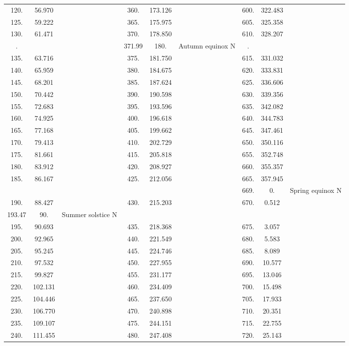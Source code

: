 \begin{tabular}{|c|c|c||c|c|c||c|c|c|}
120. &  56.970 & &360. & 173.126& &600. & 322.483&  \\ 
125. &  59.222 & &365. & 175.975& &605. & 325.358&  \\ 
130. &  61.471 & &370. & 178.850& &610. & 328.207&  \\ 
   . &         & &371.99 & 180.   & Autumn equinox N &   . &        &  \\ 
135. &  63.716 & &375. & 181.750& &615. & 331.032&  \\ 
140. &  65.959 & &380. & 184.675& &620. & 333.831&  \\ 
145. &  68.201 & &385. & 187.624& &625. & 336.606&  \\ 
150. &  70.442 & &390. & 190.598& &630. & 339.356&  \\ 
155. &  72.683 & &395. & 193.596& &635. & 342.082&  \\ 
160. &  74.925 & &400. & 196.618& &640. & 344.783&  \\ 
165. &  77.168 & &405. & 199.662& &645. & 347.461&  \\ 
170. &  79.413 & &410. & 202.729& &650. & 350.116&  \\ 
175. &  81.661 & &415. & 205.818& &655. & 352.748&  \\ 
180. &  83.912 & &420. & 208.927& &660. & 355.357&  \\ 
185. &  86.167 & &425. & 212.056& &665. & 357.945&  \\ 
  &  &  & & & &669. &   0.& Spring equinox N  \\ 
190. &  88.427 & &430. & 215.203& &670. &   0.512&  \\ 
193.47  & 90.  & Summer solstice N  & & & & &  &  \\ 
195. &  90.693 & &435. & 218.368& &675. &   3.057&  \\ 
200. &  92.965 & &440. & 221.549& &680. &   5.583&  \\ 
205. &  95.245 & &445. & 224.746& &685. &   8.089&  \\ 
210. &  97.532 & &450. & 227.955& &690. &  10.577&  \\ 
215. &  99.827 & &455. & 231.177& &695. &  13.046&  \\ 
220. & 102.131 & &460. & 234.409& &700. &  15.498&  \\ 
225. & 104.446 & &465. & 237.650& &705. &  17.933&  \\ 
230. & 106.770 & &470. & 240.898& &710. &  20.351&  \\ 
235. & 109.107 & &475. & 244.151& &715. &  22.755&  \\ 
240. & 111.455 & &480. & 247.408& &720. &  25.143&  \\ 
\hline

\end{tabular}
